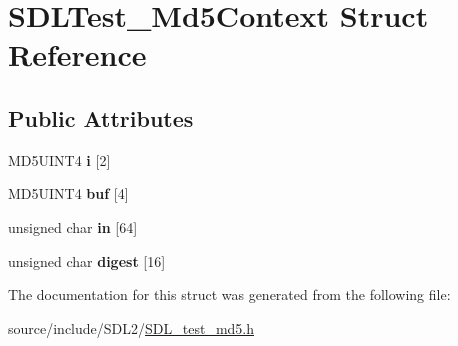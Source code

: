 \hypertarget{struct_s_d_l_test___md5_context}{}\section{S\+D\+L\+Test\+\_\+\+Md5\+Context Struct Reference}
\label{struct_s_d_l_test___md5_context}
\subsection*{Public Attributes}
\begin{DoxyCompactItemize}
\item 
\hypertarget{struct_s_d_l_test___md5_context_a95b3d5fd74fd1b7a27bf96f3bb32beb4}{}M\+D5\+U\+I\+N\+T4 {\bfseries i} \mbox{[}2\mbox{]}\label{struct_s_d_l_test___md5_context_a95b3d5fd74fd1b7a27bf96f3bb32beb4}

\item 
\hypertarget{struct_s_d_l_test___md5_context_a061f0cead7ec49ac4c5baf0bbd9c13a7}{}M\+D5\+U\+I\+N\+T4 {\bfseries buf} \mbox{[}4\mbox{]}\label{struct_s_d_l_test___md5_context_a061f0cead7ec49ac4c5baf0bbd9c13a7}

\item 
\hypertarget{struct_s_d_l_test___md5_context_a337638ef799dc0ad9397ea9b175ea388}{}unsigned char {\bfseries in} \mbox{[}64\mbox{]}\label{struct_s_d_l_test___md5_context_a337638ef799dc0ad9397ea9b175ea388}

\item 
\hypertarget{struct_s_d_l_test___md5_context_ab29079997a9f35e5d52c2aac3ad28f90}{}unsigned char {\bfseries digest} \mbox{[}16\mbox{]}\label{struct_s_d_l_test___md5_context_ab29079997a9f35e5d52c2aac3ad28f90}

\end{DoxyCompactItemize}


The documentation for this struct was generated from the following file\+:\begin{DoxyCompactItemize}
\item 
source/include/\+S\+D\+L2/\hyperlink{_s_d_l__test__md5_8h}{S\+D\+L\+\_\+test\+\_\+md5.\+h}\end{DoxyCompactItemize}
